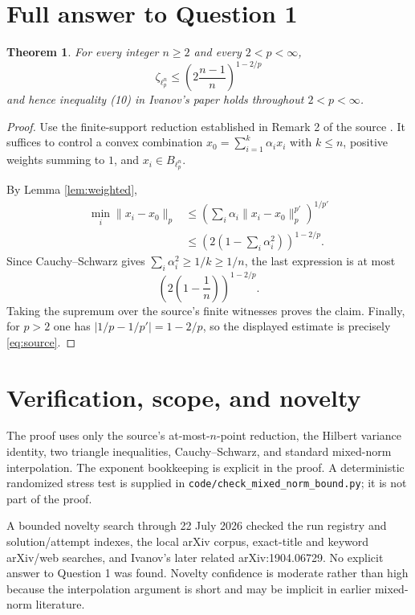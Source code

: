 \documentclass[11pt]{article}
\newtheorem{theorem}{Theorem}[section]
\begin{document}
\section{Full answer to Question 1}

\begin{theorem}\label{thm:main}
For every integer $n\ge2$ and every $2<p<\infty$,
\[
 \boxed{\displaystyle
 \zeta_{\ell_p^n}\le
 \left(2\frac{n-1}{n}\right)^{1-2/p}}
\]
and hence inequality \emph{(10)} in Ivanov's paper holds throughout
$2<p<\infty$.
\end{theorem}

\begin{proof}
Use the finite-support reduction established in Remark 2 of the source
\cite{Ivanov}.  It suffices to control a convex combination
$x_0=\sum_{i=1}^k\alpha_i x_i$ with $k\le n$, positive weights summing to
$1$, and $x_i\in B_{\ell_p^n}$.

By Lemma \ref{lem:weighted},
\begin{align*}
 \min_i\|x_i-x_0\|_p
 &\le \left(\sum_i\alpha_i\|x_i-x_0\|_p^{p'}\right)^{1/p'}\\
 &\le \left(2\left(1-\sum_i\alpha_i^2\right)\right)^{1-2/p}.
\end{align*}
Since Cauchy--Schwarz gives
$\sum_i\alpha_i^2\ge1/k\ge1/n$, the last expression is at most
\[
 \left(2\left(1-\frac1n\right)\right)^{1-2/p}.
\]
Taking the supremum over the source's finite witnesses proves the claim.
Finally, for $p>2$ one has $|1/p-1/p'|=1-2/p$, so the displayed estimate
is precisely \eqref{eq:source}.
\end{proof}

\section{Verification, scope, and novelty}

The proof uses only the source's at-most-$n$-point reduction, the Hilbert
variance identity, two triangle inequalities, Cauchy--Schwarz, and standard
mixed-norm interpolation.  The exponent bookkeeping is explicit in the
proof.  A deterministic randomized stress test is supplied in
\texttt{code/check\_mixed\_norm\_bound.py}; it is not part of the proof.

A bounded novelty search through 22 July 2026 checked the run registry and
solution/attempt indexes, the local arXiv corpus, exact-title and keyword
arXiv/web searches, and Ivanov's later related arXiv:1904.06729.  No explicit
answer to Question 1 was found.  Novelty confidence is moderate rather than
high because the interpolation argument is short and may be implicit in
earlier mixed-norm literature.
\end{document}
